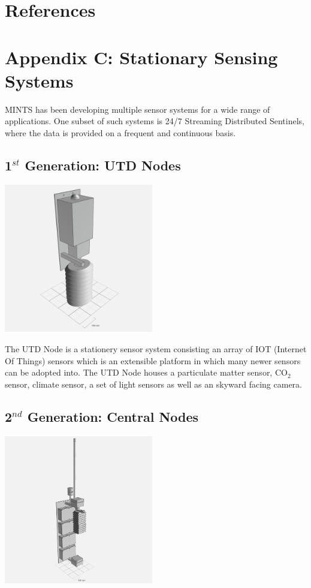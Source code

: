 \documentclass[12pt]{article}
\begin{document}
\section*{References}




\clearpage

 \section*{Appendix C: Stationary Sensing Systems}
 MINTS has been developing multiple sensor systems for a wide range of applications. One subset of such systems is 24/7 Streaming Distributed Sentinels, where the data is provided on a frequent and continuous basis.
 
 \subsection*{1$^{st}$ Generation: UTD Nodes}
    \includegraphics[width=6.5cm]
    {figures/utdNodeCropped.png}\label{fig:utdNode}

 \hfill \break
The UTD Node is a stationery sensor system consisting an array of IOT (Internet Of Things) sensors which is an extensible platform in which many newer sensors can be adopted into. The UTD Node houses a  particulate matter sensor, CO$_2$ sensor, climate sensor, a set of light sensors as well as an skyward facing camera. 

 \subsection*{2$^{nd}$ Generation: Central Nodes}
    \includegraphics[width=6.5cm]
    {figures/centralNodeCropped.png}\label{fig:centralNode}
 \hfill \break
    
\end{document}
